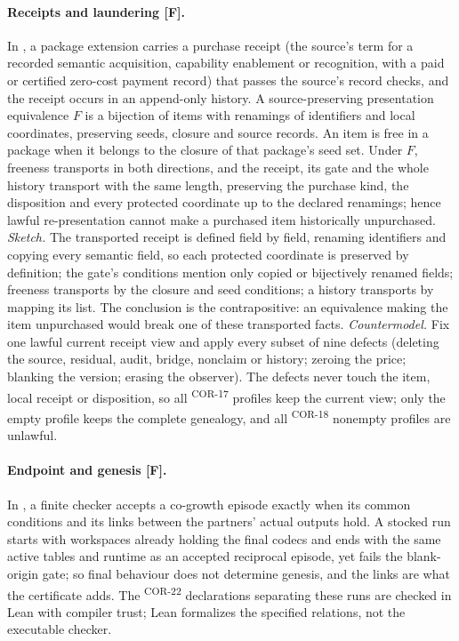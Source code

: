 \documentclass[pdflatex,sn-basic]{sn-jnl}%
\newcommand{\rec}[1]{\ifannotated\textsuperscript{\textcolor{blue!60!black}{\tiny#1}}\fi}
\begin{document}
\begin{appendices}
\paragraph{Receipts and laundering [F].} In \citet{tsiokos2026v1}, a package extension carries a purchase receipt (the source's term for a recorded semantic acquisition, capability enablement or recognition, with a paid or certified zero-cost payment record) that passes the source's record checks, and the receipt occurs in an append-only history. A source-preserving presentation equivalence $F$ is a bijection of items with renamings of identifiers and local coordinates, preserving seeds, closure and source records. An item is free in a package when it belongs to the closure of that package's seed set. Under $F$, freeness transports in both directions, and the receipt, its gate and the whole history transport with the same length, preserving the purchase kind, the disposition and every protected coordinate up to the declared renamings; hence lawful re-presentation cannot make a purchased item historically unpurchased. \emph{Sketch.} The transported receipt is defined field by field, renaming identifiers and copying every semantic field, so each protected coordinate is preserved by definition; the gate's conditions mention only copied or bijectively renamed fields; freeness transports by the closure and seed conditions; a history transports by mapping its list. The conclusion is the contrapositive: an equivalence making the item unpurchased would break one of these transported facts. \emph{Countermodel.} Fix one lawful current receipt view and apply every subset of nine defects (deleting the source, residual, audit, bridge, nonclaim or history; zeroing the price; blanking the version; erasing the observer). The defects never touch the item, local receipt or disposition, so all \numVOneDefectProfiles\rec{COR-17} profiles keep the current view; only the empty profile keeps the complete genealogy, and all \numVOneNonemptyProfiles\rec{COR-18} nonempty profiles are unlawful.

\paragraph{Endpoint and genesis [F].} In \citet{tsiokos2026v10}, a finite checker accepts a co-growth episode exactly when its common conditions and its links between the partners' actual outputs hold. A stocked run starts with workspaces already holding the final codecs and ends with the same active tables and runtime as an accepted reciprocal episode, yet fails the blank-origin gate; so final behaviour does not determine genesis, and the links are what the certificate adds. The \numVTenCompilerTrustDecls\rec{COR-22} declarations separating these runs are checked in Lean with compiler trust; Lean formalizes the specified relations, not the executable checker.


\end{appendices}
\end{document}
